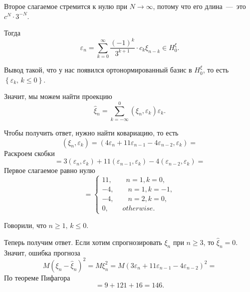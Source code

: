 \begin{enumerate}[label=\alph*)]
  Второе слагаемое стремится к нулю при $N \to \infty $,
  потому что его длина~---~это $c^N \cdot 3^{-N}$.

  Тогда
  \begin{equation*}
    \varepsilon_n =
    \sum \limits_{k = 0}^{ \infty } \frac{ \left( -1 \right)^k}{3^{k + 1}} \cdot c_k \xi_{n - k} \in
    H_0^{ \xi }.
  \end{equation*}

  Вывод такой, что у нас появился ортонормированный базис в
  $H_0^{ \xi }$, то есть $ \left\{ \varepsilon_k, \, k \leq 0 \right\} $.

  Значит, мы можем найти проекцию
  \begin{equation*}
    \hat{ \xi }_n =
    \sum \limits_{k = -\infty }^0 \left( \xi_n, \varepsilon_k \right) \varepsilon_k.
  \end{equation*}

  Чтобы получить ответ, нужно найти ковариацию, то есть
  \begin{equation*}
    \left( \xi_n, \varepsilon_k \right) =
    \left( 4 \varepsilon_n + 11 \varepsilon_{n - 1} - 4 \varepsilon_{n - 2}, \varepsilon_k \right) =
  \end{equation*}
  Раскроем скобки
  \begin{equation*}
    = 3 \left( \varepsilon_n, \varepsilon_k \right) +
    11 \left( \varepsilon_{n - 1}, \varepsilon_k \right) -
    4 \left( \varepsilon_{n - 2}, \varepsilon_k \right) =
  \end{equation*}
  Первое слагаемое равно нулю
  \begin{equation*}
    = \begin{cases}
      11, \qquad n = 1, k = 0, \\
      -4, \qquad n = 1, k = -1, \\
      -4, \qquad n = 2, k = 0, \\
      0, \qquad otherwise.
    \end{cases}
  \end{equation*}

  Говорили, что $n \geq 1, \, k \leq 0$.

  Теперь получим ответ.
  Если хотим спрогнозировать $ \xi_n$ при $n \geq 3$, то $ \hat{ \xi }_n = 0$.
  Значит, ошибка прогноза
  \begin{equation*}
    M \left( \xi_n - \hat{ \xi }_n \right)^2 =
    M \xi_n^2 =
    M \left( 3 \varepsilon_n + 11 \varepsilon_{n - 1} - 4 \varepsilon_{n - 2} \right)^2 =
  \end{equation*}
  По теореме Пифагора
  \begin{equation*}
    = 9 + 121 + 16 =
    146.
  \end{equation*}


\end{enumerate}
